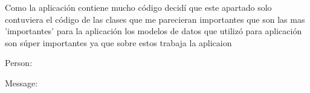 %
Como la aplicación contiene mucho código decidí que este apartado solo contuviera el código de las clases que me parecieran importantes que son las mas 'importantes' para la aplicación los modelos de datos que utilizó para aplicación son súper importantes ya que sobre estos trabaja la aplicaion

Person:

\newpage
Message:

